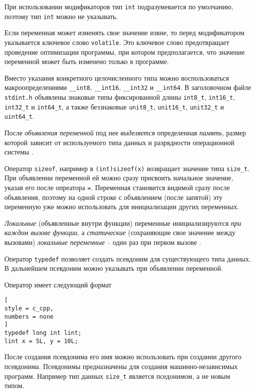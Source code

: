 \documentclass[%
	11pt,
	a4paper,
	utf8,
		]{article}
\begin{document}
При использовании модификаторов тип \verb|int| подразумевается по умолчанию, поэтому тип \verb*|int| можно не указывать.

Если переменная может изменять свое значение извне, то перед модификатором указывается ключевое слово \verb|volatile|. Это ключевое слово предотвращает проведение оптимизации программы, при котором предполагается, что значение переменной может быть изменено только в программе.

Вместо указания конкретного целочисленного типа можно воспользоваться макроопределениями \verb*|__int8|, \verb|__int16|, \verb*|__int32| и \verb|__int64|. В заголовочном файле \verb*|stdint.h| объявлены знаковые типы фиксированной длины \verb|int8_t|, \verb*|int16_t|, \verb|int32_t| и \verb*|int64_t|, а также беззнаковые \verb|unit8_t|, \verb*|unit16_t|, \verb|unit32_t| и \verb*|uint64_t|.

После \emph{объявления переменной} под нее \emph{выделяется} определенная \emph{память}, размер которой зависит от используемого типа данных и разрядности операционной системы \cite[]{prokhorenok-prog-c:2020}. 

Оператор \verb*|sizeof|, например в \verb|(int)sizeof(x)| возвращает значение типа \verb|size_t|. При объявлении переменной ей можно сразу присвоить начальное значение, указав его после опреатора \verb*|=|. Переменная становится видимой сразу после объявления, поэтому на одной строке с объявлением (после запятой) эту переменную уже можно использовать для инициализации других переменных.

\emph{Локальные} (объявленные внутри функции) переменные инициализируются \emph{при каждом вызове функции}, а \emph{статические} (сохраняющие свое значение между вызовами) \emph{локальные переменные} -- один раз при первом вызове \cite[]{prokhorenok-prog-c:2020}.

Оператор \verb*|typedef| позволяет создать псевдоним для существующего типа данных. В дальнейшем псевдоним можно указывать при объявлении переменной. 

Оператор имеет следующий формат
\begin{lstlisting}[
style = c_cpp,
numbers = none
]
typedef long int lint;
lint x = 5L, y = 10L;
\end{lstlisting}

После создания псевдонима его имя можно использовать при создании другого псевдонима. Псевдонимы предназначены для создания машинно-независимых программ. Например тип данных \verb|size_t| является пседонимом, а не новым типом.
\end{document}
